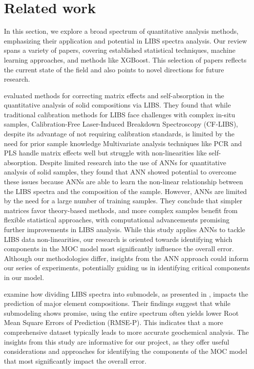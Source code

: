 \section{Related work}\label{sec:related_works}
In this section, we explore a broad spectrum of quantitative analysis methods, emphasizing their application and potential in LIBS spectra analysis. Our review spans a variety of papers, covering established statistical techniques, machine learning approaches, and methods like XGBoost. This selection of papers reflects the current state of the field and also points to novel directions for future research.

\citeauthor{takahashi_quantitative_2017} evaluated methods for correcting matrix effects and self-absorption in the quantitative analysis of solid compositions via LIBS.
They found that while traditional calibration methods for LIBS face challenges with complex in-situ samples, Calibration-Free Laser-Induced Breakdown Spectroscopy (CF-LIBS), despite its advantage of not requiring calibration standards, is limited by the need for prior sample knowledge\cite{hu_review_2022}
Multivariate analysis techniques like PCR and PLS handle matrix effects well but struggle with non-linearities like self-absorption.
Despite limited research into the use of ANNs for quantitative analysis of solid samples, they found that ANN showed potential to overcome these issues because ANNs are able to learn the non-linear relationship between the LIBS spectra and the composition of the sample.
However, ANNs are limited by the need for a large number of training samples.
They conclude that simpler matrices favor theory-based methods, and more complex samples benefit from flexible statistical approaches, with computational advancements promising further improvements in LIBS analysis\cite{takahashi_quantitative_2017}.
While this study applies ANNs to tackle LIBS data non-linearities, our research is oriented towards identifying which components in the MOC model most significantly influence the overall error. Although our methodologies differ, insights from the ANN approach could inform our series of experiments, potentially guiding us in identifying critical components in our model.

\citeauthor{lepore_quantitative_2022} examine how dividing LIBS spectra into submodels, as presented in \citet{andersonImprovedAccuracyQuantitative2017}, impacts the prediction of major element compositions.
Their findings suggest that while submodeling shows promise, using the entire spectrum often yields lower Root Mean Square Errors of Prediction (RMSE-P). 
This indicates that a more comprehensive dataset typically leads to more accurate geochemical analysis\cite{lepore_quantitative_2022}.
The insights from this study are informative for our project, as they offer useful considerations and approaches for identifying the components of the MOC model that most significantly impact the overall error.

